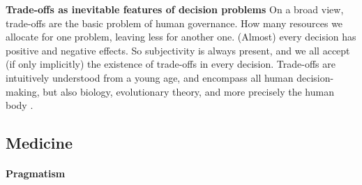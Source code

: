 \textbf{Trade-offs as inevitable features of decision problems}
On a broad view, trade-offs are the basic problem of human governance.
How many resources we allocate for one problem, leaving less for another one.
(Almost) every decision has positive and negative effects.
So subjectivity is always present, and we all accept (if only implicitly) the existence of trade-offs in every decision. 
Trade-offs are intuitively understood from a young age, and encompass all human decision-making, but also biology, evolutionary theory, and more precisely the human body \cite{Launer2020}.



\subsection{Medicine}

    \paragraph{Pragmatism}
